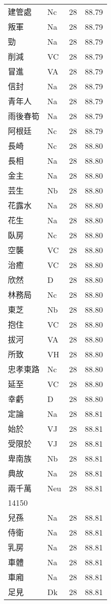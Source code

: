 \documentclass[twocolumn]{book}
\begin{document}
\begin{supertabular}{llrr}
建管處 & Nc & 28 &  88.79\\
叛軍 & Na & 28 &  88.79\\
勁 & Na & 28 &  88.79\\
削減 & VC & 28 &  88.79\\
冒進 & VA & 28 &  88.79\\
信封 & Na & 28 &  88.79\\
青年人 & Na & 28 &  88.79\\
雨後春筍 & Na & 28 &  88.79\\
阿根廷 & Nc & 28 &  88.79\\
長崎 & Nc & 28 &  88.80\\
長相 & Na & 28 &  88.80\\
金主 & Na & 28 &  88.80\\
芸生 & Nb & 28 &  88.80\\
花露水 & Na & 28 &  88.80\\
花生 & Na & 28 &  88.80\\
臥房 & Nc & 28 &  88.80\\
空襲 & VC & 28 &  88.80\\
治癒 & VC & 28 &  88.80\\
欣然 & D & 28 &  88.80\\
林務局 & Nc & 28 &  88.80\\
東芝 & Nb & 28 &  88.80\\
抱住 & VC & 28 &  88.80\\
拔河 & VA & 28 &  88.80\\
所致 & VH & 28 &  88.80\\
忠孝東路 & Nc & 28 &  88.80\\
延至 & VC & 28 &  88.80\\
幸虧 & D & 28 &  88.80\\
定論 & Na & 28 &  88.81\\
始於 & VJ & 28 &  88.81\\
受限於 & VJ & 28 &  88.81\\
卑南族 & Nb & 28 &  88.81\\
典故 & Na & 28 &  88.81\\
兩千萬 & Neu & 28 &  88.81\\
14150\\
兒孫 & Na & 28 &  88.81\\
侍衛 & Na & 28 &  88.81\\
乳房 & Na & 28 &  88.81\\
車體 & Na & 28 &  88.81\\
車廂 & Na & 28 &  88.81\\
足見 & Dk & 28 &  88.81\\

\end{supertabular}
\end{document}
